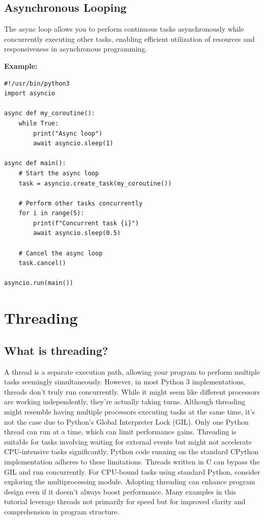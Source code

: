 \documentclass{report}
\begin{document}
    \subsection{Asynchronous Looping}
    \bigbreak \noindent 
    The async loop allows you to perform continuous tasks asynchronously while concurrently executing other tasks, enabling efficient utilization of resources and responsiveness in asynchronous programming.
    \bigbreak \noindent 
    \begin{mdframed}
      \textbf{Example: }
      \begin{verbatim}
#!/usr/bin/python3
import asyncio

async def my_coroutine():
    while True:
        print("Async loop")
        await asyncio.sleep(1)

async def main():
    # Start the async loop
    task = asyncio.create_task(my_coroutine())

    # Perform other tasks concurrently
    for i in range(5):
        print(f"Concurrent task {i}")
        await asyncio.sleep(0.5)

    # Cancel the async loop
    task.cancel()

asyncio.run(main())
      \end{verbatim}
    \end{mdframed}


    \pagebreak \bigbreak \noindent
    \section{Threading}
    \bigbreak \noindent 
    \subsection{What is threading?}
    \bigbreak \noindent 
    A thread is a separate execution path, allowing your program to perform multiple tasks seemingly simultaneously. However, in most Python 3 implementations, threads don't truly run concurrently. While it might seem like different processors are working independently, they're actually taking turns.
    \bigbreak \noindent 
    Although threading might resemble having multiple processors executing tasks at the same time, it's not the case due to Python's Global Interpreter Lock (GIL). Only one Python thread can run at a time, which can limit performance gains. Threading is suitable for tasks involving waiting for external events but might not accelerate CPU-intensive tasks significantly.
    \bigbreak \noindent 
    Python code running on the standard CPython implementation adheres to these limitations. Threads written in C can bypass the GIL and run concurrently. For CPU-bound tasks using standard Python, consider exploring the multiprocessing module.
    \bigbreak \noindent 
    Adopting threading can enhance program design even if it doesn't always boost performance. Many examples in this tutorial leverage threads not primarily for speed but for improved clarity and comprehension in program structure.
    \bigbreak \noindent 
\end{document}
